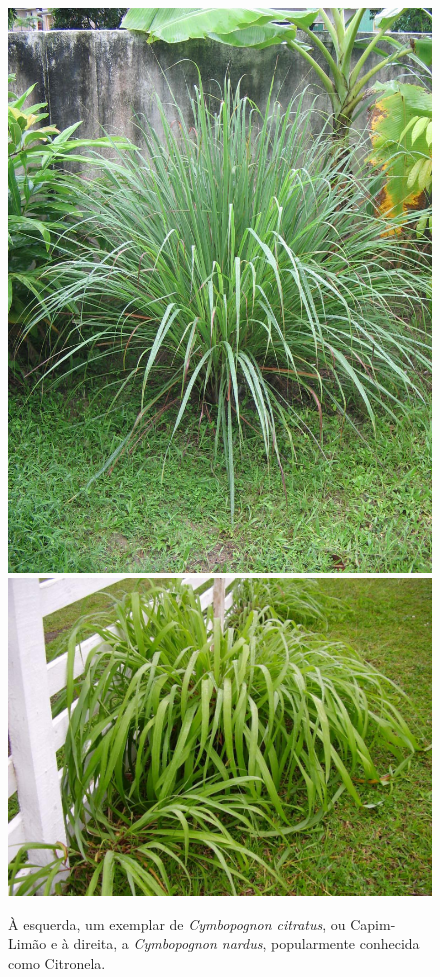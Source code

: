 \documentclass[
	article,			%
	11pt,				%
	oneside,			%
	a4paper,			%
	english,			%
	brazil,				%
	]{abntex2}
\begin{document}
\begin{figure}[tb]
	\begin{center}
		\includegraphics[scale=0.15]{imgs/capim_limao.JPG} \quad 
		\includegraphics[scale=0.15]{imgs/citronela.jpg} 
		\caption{À esquerda, um exemplar de \emph{Cymbopognon citratus}, ou Capim-Limão e à direita, a \emph{Cymbopognon nardus}, popularmente conhecida como Citronela.}
		\label{fig:capim_limao_citronela}
	\end{center}
\end{figure}
\end{document}
